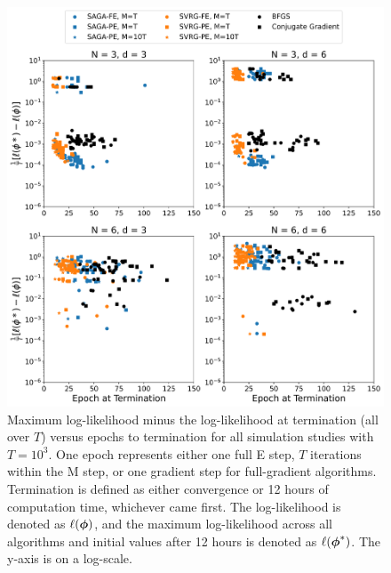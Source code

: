 \documentclass[12pt]{article}
\begin{document}
\begin{figure}[H]
    \centering
    \includegraphics[width=6.5in]{../plt/scatter_sim_T_1000_epoch.png}
    \caption{Maximum log-likelihood minus the log-likelihood at termination (all over $T$) versus epochs to termination for all simulation studies with $T=10^{3}$. One epoch represents either one full E step, $T$ iterations within the M step, or one gradient step for full-gradient algorithms. Termination is defined as either convergence or 12 hours of computation time, whichever came first. The log-likelihood is denoted as $\ell(\boldsymbol{\phi})$, and the maximum log-likelihood across all algorithms and initial values after 12 hours is denoted as $\ell(\boldsymbol{\phi}^*)$. The y-axis is on a log-scale.}
    \label{fig:scatter_sim}
\end{figure}
%
\end{document}
